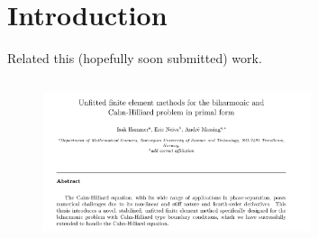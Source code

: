 \section{Introduction}


\begin{frame}{Related this (hopefully soon submitted) work. }
    \begin{columns}
        \begin{column}{1.0\textwidth}
            \begin{figure}
                \centering
                \includegraphics[width=0.7\textwidth]{CH-example/abstract.png}
            \end{figure}
        \end{column}
    \end{columns}
\end{frame}



